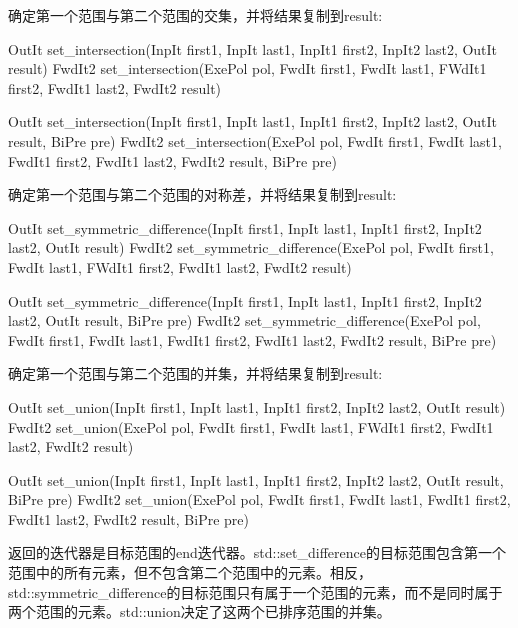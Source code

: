 确定第一个范围与第二个范围的交集，并将结果复制到result:

\begin{cpp}
OutIt set_intersection(InpIt first1, InpIt last1, InpIt1 first2, InpIt2 last2,
					   OutIt result)
FwdIt2 set_intersection(ExePol pol, FwdIt first1, FwdIt last1,
						FWdIt1 first2, FwdIt1 last2, FwdIt2 result)
						
OutIt set_intersection(InpIt first1, InpIt last1, InpIt1 first2, InpIt2 last2,
					   OutIt result, BiPre pre)
FwdIt2 set_intersection(ExePol pol, FwdIt first1, FwdIt last1,
						FwdIt1 first2, FwdIt1 last2, FwdIt2 result, BiPre pre)
\end{cpp}

确定第一个范围与第二个范围的对称差，并将结果复制到result:

\begin{cpp}
OutIt set_symmetric_difference(InpIt first1, InpIt last1,
								InpIt1 first2, InpIt2 last2, OutIt result)
FwdIt2 set_symmetric_difference(ExePol pol, FwdIt first1, FwdIt last1,
								FWdIt1 first2, FwdIt1 last2, FwdIt2 result)

OutIt set_symmetric_difference(InpIt first1, InpIt last1,
							   InpIt1 first2, InpIt2 last2, OutIt result,
							   BiPre pre)
FwdIt2 set_symmetric_difference(ExePol pol, FwdIt first1, FwdIt last1,
								FwdIt1 first2, FwdIt1 last2, FwdIt2 result,
								BiPre pre)
\end{cpp}

确定第一个范围与第二个范围的并集，并将结果复制到result:

\begin{cpp}
OutIt set_union(InpIt first1, InpIt last1,
				InpIt1 first2, InpIt2 last2, OutIt result)
FwdIt2 set_union(ExePol pol, FwdIt first1, FwdIt last1,
				 FWdIt1 first2, FwdIt1 last2, FwdIt2 result)

OutIt set_union(InpIt first1, InpIt last1,
				InpIt1 first2, InpIt2 last2, OutIt result, BiPre pre)
FwdIt2 set_union(ExePol pol, FwdIt first1, FwdIt last1,
				 FwdIt1 first2, FwdIt1 last2, FwdIt2 result, BiPre pre)
\end{cpp}

返回的迭代器是目标范围的end迭代器。std::set\_difference的目标范围包含第一个范围中的所有元素，但不包含第二个范围中的元素。相反，std::symmetric\_difference的目标范围只有属于一个范围的元素，而不是同时属于两个范围的元素。std::union决定了这两个已排序范围的并集。


